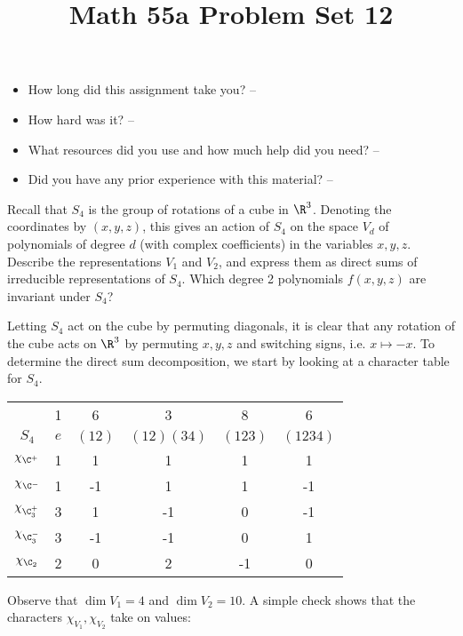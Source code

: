 \documentclass[11pt,letterpaper]{article}
\title{\textbf{Math 55a Problem Set 12}}
\begin{document}
\maketitle
\setcounter{page}{0}
\thispagestyle{empty}

\begin{itemize}
  \item How long did this assignment take you? -- 
  \item How hard was it? -- 
  \item What resources did you use and how much help did you need? -- 
  \item Did you have any prior experience with this material? -- 
\end{itemize}

\pagebreak
\begin{problem}
    Recall that $S_4$ is the group of rotations of a cube in $\R^3$. Denoting the coordinates by $(x,y,z)$, this gives an action of $S_4$ on the space $V_d$ of polynomials of degree $d$ (with complex coefficients) in the variables $x,y,z$.  Describe the representations $V_1$ and $V_2$, and express them as direct sums of irreducible representations of $S_4$. Which degree 2 polynomials $f(x,y,z)$ are invariant under $S_4$?
\end{problem}

Letting $S_4$ act on the cube by permuting diagonals, it is clear that any rotation of the cube acts on $\R^3$ by permuting $x,y,z$ and switching signs, i.e. $x\mapsto -x$. To determine the direct sum decomposition, we start by looking at a character table for $S_4$.

\begin{center}
\begin{tabular}{ c|ccccc } 
    & 1 & 6 & 3 & 8 & 6\\
    $S_4$ & $e$ & $(12)$ & $(12)(34)$ & $(123)$ & $(1234)$ \\
\hline
    $\chi_{\C^+}$ & 1 & 1 & 1 & 1 & 1\\
    $\chi_{\C^-}$ & 1 & -1 & 1 & 1 & -1\\
    $\chi_{\C_3^+}$ & 3 & 1 & -1 & 0 & -1\\
    $\chi_{\C_3^-}$ & 3 & -1 & -1 & 0 & 1\\
    $\chi_{\C_2}$ & 2 & 0 & 2 & -1 & 0
\end{tabular}
\end{center}

Observe that $\dim V_1=4$ and $\dim V_2=10$. A simple check shows that the characters $\chi_{V_1}, \chi_{V_2}$ take on values:
\end{document}
